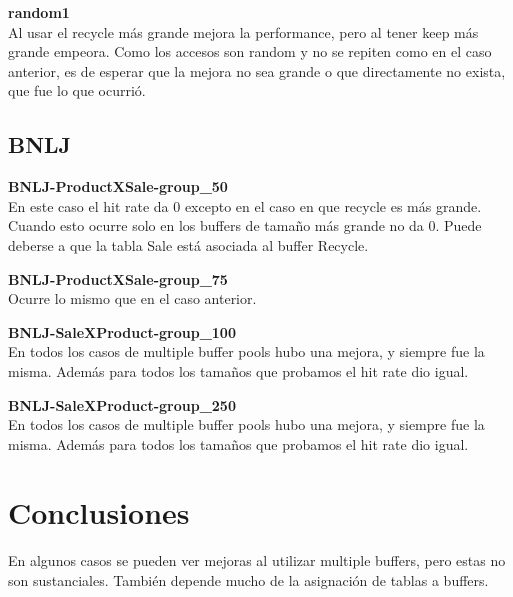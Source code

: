 \vspace*{0.5cm}

\textbf{random1} \\

Al usar el recycle más grande mejora la performance, pero al 
tener keep más grande empeora. Como los accesos son random y
no se repiten como en el caso anterior, es de esperar que la
mejora no sea grande o que directamente no exista, que fue
lo que ocurrió.


\subsection{BNLJ}

\textbf{BNLJ-ProductXSale-group\_50} \\

En este caso el hit rate da 0 excepto en el caso en que recycle
es más grande. Cuando esto ocurre solo en los buffers de tamaño
más grande no da 0. Puede deberse a que la tabla Sale está 
asociada al buffer Recycle. 

\vspace*{0.5cm}

\textbf{BNLJ-ProductXSale-group\_75} \\

Ocurre lo mismo que en el caso anterior.


\vspace*{0.5cm}

\textbf{BNLJ-SaleXProduct-group\_100} \\

En todos los casos de multiple buffer pools hubo una mejora, 
y siempre fue la misma. Además para todos los tamaños que
probamos el hit rate dio igual.


\vspace*{0.5cm}

\textbf{BNLJ-SaleXProduct-group\_250} \\

En todos los casos de multiple buffer pools hubo una mejora, 
y siempre fue la misma. Además para todos los tamaños que
probamos el hit rate dio igual.

\section{Conclusiones}

En algunos casos se pueden ver mejoras al utilizar multiple buffers,
pero estas no son sustanciales. También depende mucho de la
asignación de tablas a buffers.

